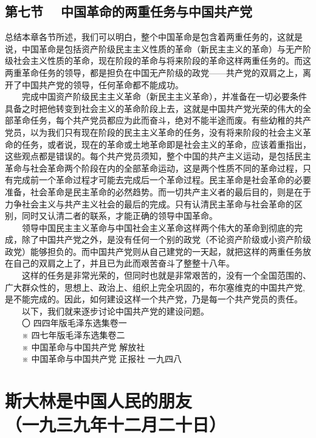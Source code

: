 \documentclass[cn,11pt,chinese]{elegantbook}
\def\myformat#1{\hfil\hfil #1}
\begin{document}
\subsection*{\myformat{第七节　 中国革命的两重任务与中国共产党}}
总结本章各节所述，我们可以明白，整个中国革命是包含着两重任务的，这就是说，中国革命是包括资产阶级民主主义性质的革命（新民主主义的革命）与无产阶级社会主义性质的革命，现在阶段的革命与将来阶段的革命这样两重任务的。而这两重革命任务的领导，都是担负在中国无产阶级的政党——共产党的双肩之上，离开了中国共产党的领导，任何革命都不能成功。\\
　　完成中国资产阶级民主主义革命（新民主主义革命），并准备在一切必要条件具备之时把他转变到社会主义的革命阶段上去，这就是中国共产党光荣的伟大的全部革命任务，每个共产党员都应为此而奋斗，绝对不能半途而废。有些幼稚的共产党员，以为我们只有现在阶段的民主主义革命的任务，没有将来阶段的社会主义革命的任务，或者说，现在的革命或土地革命即是社会主义的革命，应该着重指出，这些观点都是错误的。每个共产党员须知，整个中国的共产主义运动，是包括民主革命与社会革命两个阶段在内的全部革命运动，这是两个性质不同的革命过程，只有完成前一个革命过程才可能去完成后一个革命过程。民主革命是社会革命的必要准备，社会革命是民主革命的必然趋势。而一切共产主义者的最后目的，则是在于力争社会主义与共产主义社会的最后的完成。只有认清民主革命与社会革命的区别，同时又认清二者的联系，才能正确的领导中国革命。\\
　　领导中国民主主义革命与中国社会主义革命这样两个伟大的革命到彻底的完成，除了中国共产党之外，是没有任何一个别的政党（不论资产阶级或小资产阶级政党）能够担负的。而中国共产党则从自己建党的一天起，就把这样的两重任务放在自己的双肩之上了，并且已为此而艰苦奋斗了整整十八年。\\
　　这样的任务是非常光荣的，但同时也就是非常艰苦的，没有一个全国范围的、广大群众性的，思想上、政治上、组织上完全巩固的，布尔塞维克的中国共产党, 是不能完成的。因此，如何建设这样一个共产党，乃是每一个共产党员的责任。\\
　　以下，我们就来逐步讨论中国共产党的建设问题。\\
　　〇 四四年版毛泽东选集卷一\\
　　※ 四七年版毛泽东选集卷二\\
　　※ 中国革命与中国共产党 解放社\\
　　※ 中国革命与中国共产党 正报社  一九四八　\\
\newpage\section*{\myformat{斯大林是中国人民的朋友}\\\myformat{（一九三九年十二月二十日）}}
\end{document}
